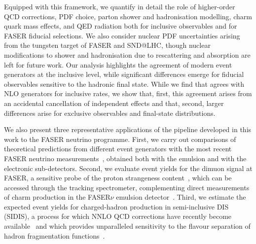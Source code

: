 Equipped with this framework, we quantify in detail
the role of higher-order QCD corrections, PDF choice, parton shower and hadronisation modelling, charm quark mass effects, and QED radiation both for inclusive observables and for FASER fiducial selections. 
%
We also consider nuclear PDF uncertainties arising from the tungsten target of FASER and SND@LHC, though nuclear modifications to shower and hadronisation due to rescattering and absorption are left for future work. 
%
Our analysis highlights the agreement of modern event generators at the inclusive level, while significant differences emerge for fiducial observables sensitive to the hadronic final state. 
%
While we find that \genie agrees with NLO generators for inclusive rates, we show that, first, this agreement arises from an accidental cancellation of independent effects and that, second, larger differences arise for exclusive observables and final-state distributions. 

We also present three representative applications of the pipeline developed in this work to the FASER neutrino programme.
%
First, we carry out comparisons of theoretical predictions from different event generators with the most recent FASER neutrino measurements~\cite{FASER:2024hoe,FASERnu:2026conf,FASER:2026nu680,FASER:2024ref,FASER:2026enu2d}, obtained both with the emulsion and with the electronic sub-detectors.
%
Second, we evaluate event yields for the dimuon signal at FASER, a sensitive probe of the proton strangeness content~\cite{Faura:2020oom,Helenius:2026uuz}, which can be accessed through the tracking spectrometer, complementing direct measurements of charm production in the FASER$\nu$ emulsion detector~\cite{FASER:2026charm}.  
%
Third, we estimate the expected event yields for charged-hadron production in semi-inclusive DIS (SIDIS), a process for which NNLO QCD corrections have recently become available~\cite{Goyal:2023zdi,Bonino:2024qbh,Bonino:2025ident,Bonino:2025qta,Goyal:2024tmo,Bonino:2024wgg,Bonino:2025sidis}  and which provides unparalleled sensitivity to the flavour separation of hadron fragmentation functions~\cite{Bertone:2017tyb,Bertone:2018ecm,Borsa:2021ran,deFlorian:2017lwf,Moffat:2021dji}. 

